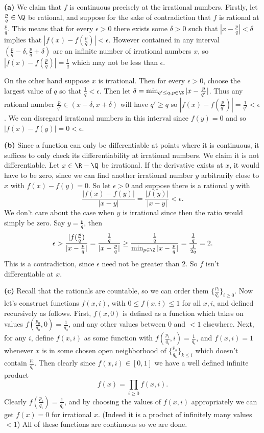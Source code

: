 \documentclass[11pt,letterpaper]{article}
\begin{document}
\begin{solution}
    \textbf{(a)} We claim that $f$ is continuous precisely at the irrational numbers. Firstly, let $\frac{p}{q}\in \Q$ be rational, and suppose for the sake of contradiction that $f$ is rational at $\frac{p}{q}$. This means that for every $\epsilon>0$ there exists some $\delta>0$ such that $|x-\frac{p}{q}|<\delta$ implies that $|f(x)-f(\frac{p}{q})|<\epsilon$. However contained in any interval $(\frac{p}{q}-\delta, \frac{p}{q}+\delta)$ are an infinite number of irrational numbers $x$, so $|f(x)-f(\frac{p}{q})|=\frac{1}{q}$ which may not be less than $\epsilon$. 
    
    On the other hand suppose $x$ is irrational. Then for every $\epsilon>0$, choose the largest value of $q$ so that $\frac{1}{q}<\epsilon$. Then let $\delta=\min_{q'\leq q, p\in \Z} | x- \frac{p}{q'}|$. Thus any rational number $\frac{p}{q'}\in (x-\delta, x+\delta)$ will have $q'\geq q$ so $|f(x)-f(\frac{p}{q'})|=\frac{1}{q'}<\epsilon$. We can disregard irrational numbers in this interval since $f(y)=0$ and so $|f(x)-f(y)|=0 < \epsilon$.    
    
    \textbf{(b)} Since a function can only be differentiable at points where it is continuous, it suffices to only check its differentiability at irrational numbers. We claim it is not differentiable. Let $x\in \R-\Q$ be irrational. If the derivative exists at $x$, it would have to be zero, since we can find another irrational number $y$ arbitrarily close to $x$ with $f(x)-f(y)=0$. So let $\epsilon>0$ and suppose there is a rational $y$ with
    \[
        \frac{|f(x)-f(y)|}{|x-y|}=\frac{|f(y)|}{|x-y|}<\epsilon
    .\] 
    We don't care about the case when $y$ is irrational since then the ratio would simply be zero. Say $y=\frac{p}{q}$, then
    \[
        \epsilon > \frac{|f(\frac{p}{q})}{|x-\frac{p}{q}|} = \frac{\frac{1}{q}}{|x-\frac{p}{q}|} \geq \frac{\frac{1}{q}}{\min_{p\in\Z} |x-\frac{p}{q}|} = \frac{\frac{1}{q}}{\frac{1}{2q}} = 2
    .\] 
    This is a contradiction, since $\epsilon$ need not be greater than $2$. So $f$ isn't differentiable at $x$.

    \textbf{(c)} Recall that the rationals are countable, so we can order them $\{\frac{p_i}{q_i}\}_{i\geq 0}$. Now let's construct functions $f(x,i)$, with $0\leq f(x,i)\leq 1$ for all $x,i$, and defined recursively as follows. First, $f(x,0)$ is defined as a function which takes on values $f(\frac{p_0}{q_0},0)=\frac{1}{q_0}$, and any other values between $0$ and $<1$ elsewhere. Next, for any $i$, define $f(x,i)$ as some function with $f(\frac{p_i}{q_i}, i)=\frac{1}{q_i}$, and $f(x,i)=1$ whenever $x$ is in some chosen open neighborhood of $\{\frac{p_k}{q_k}\}_{k\leq i}$ which doesn't contain $\frac{p_i}{q_i}$. Then clearly since $f(x,i) \in [0,1]$ we have a well defined infinite product
    \[
        f(x)=\prod_{i\geq 0}f(x,i)
    .\] 
    Clearly $f(\frac{p_i}{q_i})=\frac{1}{q_i}$, and by choosing the values of $f(x,i)$ appropriately we can get $f(x)=0$ for irrational $x$. (Indeed it is a product of infinitely many values $<1$) All of these functions are continuous so we are done.
    

\end{solution}
\end{document}
